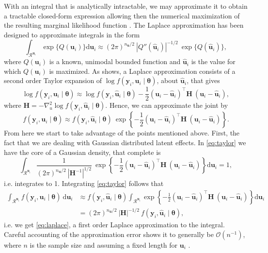 With an integral that is analytically intractable, we may approximate it
to obtain a tractable closed-form expression allowing then the numerical
maximization of the resulting marginal likelihood function
\cite{patrao}. The Laplace approximation has been designed to
approximate integrals in the form
\begin{equation}
  \int_{\mathcal{R}^{\mathbf{u}_{i}}}
  \exp\{Q(\mathbf{u}_{i})\} \text{d} \mathbf{u}_{i}\approx
  (2\pi)^{n_{\mathbf{u}}/2}~
  |{Q}''(\mathbf{\hat{u}}_{i})|^{-1/2}~\exp\{Q(\mathbf{\hat{u}}_{i})\},
  \label{eq:laplace}
\end{equation}
where \(Q(\mathbf{u}_{i})\) is a known, unimodal bounded function and
\(\mathbf{\hat{u}}_{i}\) is the value for which \(Q(\mathbf{u}_{i})\) is
maximized. As  shows, a Laplace approximation
consists of a second order Taylor expansion of \(\log f(\mathbf{y}_{i},
\mathbf{u}_{i} \mid \bm{\theta})\), about \(\mathbf{\hat{u}}_{i}\), that
gives
\[
  \log f(\mathbf{y}_{i}, \mathbf{u}_{i} \mid \bm{\theta})\approx
  \log f(\mathbf{y}_{i}, \mathbf{\hat{u}}_{i} \mid \bm{\theta}) -
  \frac{1}{2}
  (\mathbf{u}_{i} - \mathbf{\hat{u}}_{i})^{\top}\mathbf{H}~
  (\mathbf{u}_{i} - \mathbf{\hat{u}}_{i}),
\]
where \(\mathbf{H} = - \nabla_{u}^{2} \log f(\mathbf{y}_{i},
\mathbf{\hat{u}}_{i} \mid \bm{\theta})\). Hence, we can approximate the
joint by
\begin{equation}
  f(\mathbf{y}_{i}, \mathbf{u}_{i} \mid \bm{\theta})\approx
  f(\mathbf{y}_{i}, \mathbf{\hat{u}}_{i} \mid \bm{\theta})~\exp
  \left\{- \frac{1}{2}
    (\mathbf{u}_{i} - \mathbf{\hat{u}}_{i})^{\top}\mathbf{H}~
    (\mathbf{u}_{i} - \mathbf{\hat{u}}_{i})
  \right\}.
  \label{eq:taylor}
\end{equation}
From here we start to take advantage of the points mentioned above.
First, the fact that we are dealing with Gaussian distributed latent
effects. In \autoref{eq:taylor} we have the core of a Gaussian density,
that complete is
\[
  \int_{\mathcal{R}^{\mathbf{u}_{i}}}
  \frac{1}{(2\pi)^{n_{\mathbf{u}}/2}~|\mathbf{H}^{-1}|^{1/2}}~\exp
  \left\{- \frac{1}{2}
    (\mathbf{u}_{i} - \mathbf{\hat{u}}_{i})^{\top}\mathbf{H}~
    (\mathbf{u}_{i} - \mathbf{\hat{u}}_{i})
  \right\} \text{d}\mathbf{u}_{i} = 1,
\]
i.e. integrates to 1. Integrating \autoref{eq:taylor} follows that
\begin{align*}
  \int_{\mathcal{R}^{\mathbf{u}_{i}}}
  f(\mathbf{y}_{i}, \mathbf{u}_{i} \mid \bm{\theta})
  ~\text{d}\mathbf{u}_{i}
  &\approx f(\mathbf{y}_{i}, \mathbf{\hat{u}}_{i} \mid \bm{\theta})
    \int_{\mathcal{R}^{\mathbf{u}_{i}}} \exp
    \left\{- \frac{1}{2}
    (\mathbf{u}_{i} - \mathbf{\hat{u}}_{i})^{\top}\mathbf{H}~
    (\mathbf{u}_{i} - \mathbf{\hat{u}}_{i})
    \right\} \text{d}\mathbf{u}_{i}\\
  &= (2\pi)^{n_{\mathbf{u}}/2}~|\mathbf{H}|^{-1/2}~
    f(\mathbf{y}_{i}, \mathbf{\hat{u}}_{i} \mid \bm{\theta}),
\end{align*}
i.e. we get \autoref{eq:laplace}, a first order Laplace approximation to
the integral. Careful accounting of the approximation error shows it to
generally be \(\mathcal{O}(n^{-1})\), where \(n\) is the sample size and
assuming a fixed length for \(\mathbf{u}_{i}\) \cite{corestats}.

